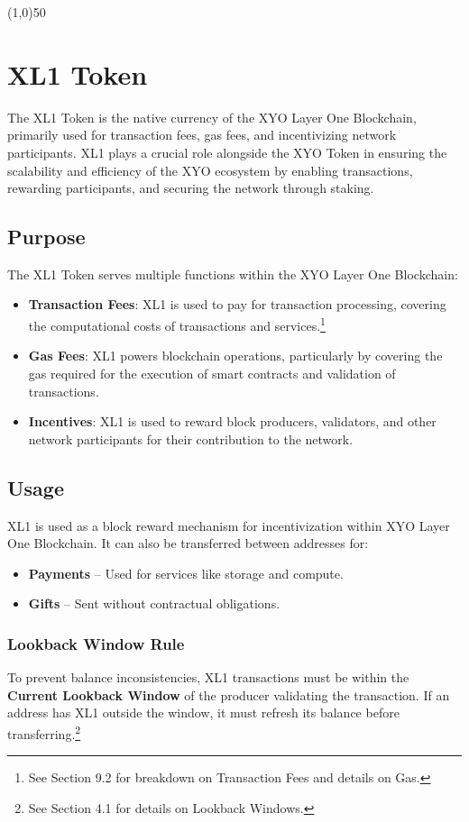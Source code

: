 \documentclass{article}
\begin{document}
\begin{center}
    \line(1,0){50}
\end{center}

\section{XL1 Token}
The XL1 Token is the native currency of the XYO Layer One Blockchain, primarily used for transaction fees, gas fees, and incentivizing network participants. XL1 plays a crucial role alongside the XYO Token in ensuring the scalability and efficiency of the XYO ecosystem by enabling transactions, rewarding participants, and securing the network through staking. 

\subsection{Purpose}
The XL1 Token serves multiple functions within the XYO Layer One Blockchain: 

\begin{itemize}
    \item \textbf{Transaction Fees}: XL1 is used to pay for transaction processing, covering the computational costs of transactions and services.\footnote{See Section 9.2 for breakdown on Transaction Fees and details on Gas.}
    \item \textbf{Gas Fees}: XL1 powers blockchain operations, particularly by covering the gas required for the execution of smart contracts and validation of transactions.
    \item \textbf{Incentives}: XL1 is used to reward block producers, validators, and other network participants for their contribution to the network.
\end{itemize}

\subsection{Usage}
XL1 is used as a block reward mechanism for incentivization within XYO Layer One Blockchain. It can also be transferred between addresses for:
\begin{itemize}
    \item \textbf{Payments} – Used for services like storage and compute.
    \item \textbf{Gifts} – Sent without contractual obligations.
\end{itemize}

\subsubsection{Lookback Window Rule}
To prevent balance inconsistencies, XL1 transactions must be within the
\textbf{Current Lookback Window} of the producer validating the transaction. If
an address has XL1 outside the window, it must refresh its balance before
transferring.\footnote{See Section 4.1 for details on Lookback Windows.}
\end{document}
